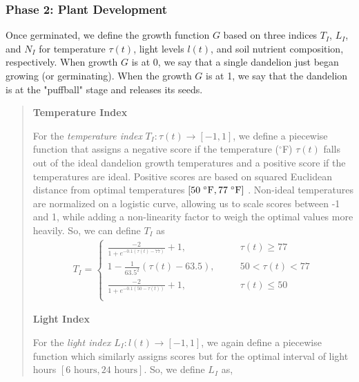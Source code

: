 \subsubsection{Phase 2: Plant Development}

Once germinated, we define the growth function \(G\) based on three indices \(T_I\), \(L_I\), and \(N_I\) for temperature \(\tau(t)\), light levels \(l(t)\), and soil nutrient composition, respectively. When growth \(G\) is at 0, we say that a single dandelion just began growing (or germinating). When the growth \(G\) is at 1, we say that the dandelion is at the "puffball" stage and releases its seeds.

\begin{quote}
\textbf{Temperature Index}

For the \textit{temperature index} \(T_I: \tau(t) \longrightarrow [-1, 1]\), we define a piecewise function that assigns a negative score if the temperature (\(^\circ\)F) \(\tau(t)\)  falls out of the ideal dandelion growth temperatures and a positive score if the temperatures are ideal.  Positive scores are based on squared Euclidean distance from optimal temperatures \([50\hspace{0.1cm}^\circ\text{F},  77\hspace{0.1cm}^\circ\text{F}]\) \cite{board_of_pesticides_control_maine_dacf_dandelion-taraxacum_nodate}. Non-ideal temperatures are normalized on a logistic curve, allowing us to scale scores between -1 and 1, while adding a non-linearity factor to weigh the optimal values more heavily. So, we can define \(T_I\) as
\begin{align}
    T_I = 
    \begin{cases}
        \frac{-2}{1+e^{-0.1(\tau(t)-77)}} + 1, \hspace{2cm} & \tau(t) \geq 77 \\
        1 - \frac{1}{63.5^2} (\tau(t) - 63.5), & 50 < \tau(t) < 77 \\
        \frac{-2}{1+e^{-0.1(50-\tau(t))}} + 1, \hspace{2cm} & \tau(t) \leq 50\\
    \end{cases}
    \label{eq:tempindex}
\end{align}

\textbf{Light Index}

For the \textit{light index} \(L_I: l(t) \longrightarrow [-1, 1]\), we again define a piecewise function which similarly assigns scores but for the optimal interval of light hours \([6 \text{ hours}, 24 \text{ hours}]\)\cite{stewart-wade_biology_2002}. So, we define \(L_I\) as,


\end{quote}
